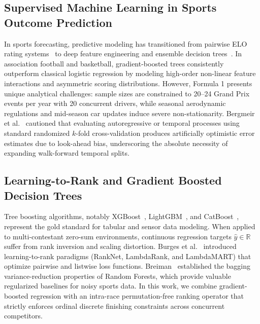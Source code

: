 \documentclass[journal]{IEEEtran}
\begin{document}
\subsection{Supervised Machine Learning in Sports Outcome Prediction}
In sports forecasting, predictive modeling has transitioned from pairwise ELO rating systems~\cite{hvattum2010using} to deep feature engineering and ensemble decision trees~\cite{baboota2019predictive, bunker2019machine}. In association football and basketball, gradient-boosted trees consistently outperform classical logistic regression by modeling high-order non-linear feature interactions and asymmetric scoring distributions. However, Formula 1 presents unique analytical challenges: sample sizes are constrained to 20--24 Grand Prix events per year with 20 concurrent drivers, while seasonal aerodynamic regulations and mid-season car updates induce severe non-stationarity. Bergmeir et al.~\cite{bergmeir2018note} cautioned that evaluating autoregressive or temporal processes using standard randomized $k$-fold cross-validation produces artificially optimistic error estimates due to look-ahead bias, underscoring the absolute necessity of expanding walk-forward temporal splits.

\subsection{Learning-to-Rank and Gradient Boosted Decision Trees}
Tree boosting algorithms, notably XGBoost~\cite{chen2016xgboost}, LightGBM~\cite{ke2017lightgbm}, and CatBoost~\cite{prokhorenkova2018catboost}, represent the gold standard for tabular and sensor data modeling. When applied to multi-contestant zero-sum environments, continuous regression targets $\hat{y} \in \mathbb{R}$ suffer from rank inversion and scaling distortion. Burges et al.~\cite{burges2005learning, burges2010lambdamart} introduced learning-to-rank paradigms (RankNet, LambdaRank, and LambdaMART) that optimize pairwise and listwise loss functions. Breiman~\cite{breiman2001random} established the bagging variance-reduction properties of Random Forests, which provide valuable regularized baselines for noisy sports data. In this work, we combine gradient-boosted regression with an intra-race permutation-free ranking operator that strictly enforces ordinal discrete finishing constraints across concurrent competitors.
\end{document}

